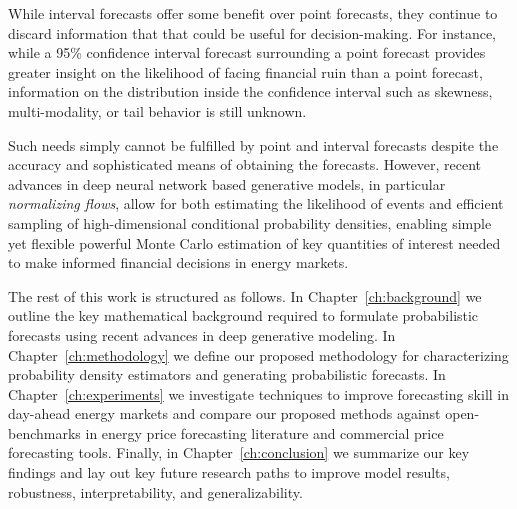 While interval forecasts offer some benefit over point forecasts, they continue to discard information that
that could be useful for decision-making.
For instance, while a 95\% confidence interval forecast surrounding a point forecast provides greater insight on the
likelihood of facing financial ruin than a point forecast, information on the distribution inside the confidence
interval such as skewness, multi-modality, or tail behavior is still unknown.

Such needs simply cannot be fulfilled by point and interval forecasts despite the accuracy and sophisticated means of
obtaining the forecasts.
However, recent advances in deep neural network based generative models, in particular \textit{normalizing flows}, allow
for both estimating the likelihood of events and efficient sampling of high-dimensional conditional probability densities,
enabling simple yet flexible powerful Monte Carlo estimation of key quantities of interest needed to make informed
financial decisions in energy markets.

The rest of this work is structured as follows.
In Chapter~\ref{ch:background} we outline the key mathematical background required to formulate probabilistic forecasts
using recent advances in deep generative modeling.
In Chapter~\ref{ch:methodology} we define our proposed methodology for characterizing probability density estimators
and generating probabilistic forecasts.
In Chapter~\ref{ch:experiments} we investigate techniques to improve forecasting skill in day-ahead energy markets and
compare our proposed methods against open-benchmarks in energy price forecasting literature and commercial price
forecasting tools.
Finally, in Chapter~\ref{ch:conclusion} we summarize our key findings and lay out key future research paths to improve
model results, robustness, interpretability, and generalizability.
